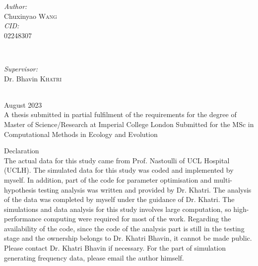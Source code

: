 \documentclass[12pt]{article}
\begin{document}
\begin{titlepage}

\begin{minipage}{0.4\textwidth}
\begin{flushleft} \large
\emph{Author:}\\
Chuxinyao \textsc{Wang} \\ %

\emph{CID:}\\
02248307
\end{flushleft}
\end{minipage}
~
\begin{minipage}{0.5\textwidth}
\begin{flushright} \large
\emph{Supervisor:} \\
Dr. Bhavin \textsc{Khatri} \\[0.5cm] %
\end{flushright}
\end{minipage}\\[1cm]


{\large August 2023}\\[0.5cm] %
A thesis submitted in partial fulfilment of the requirements for the degree of
Master of Science/Research at Imperial College London
Submitted for the MSc in Computational Methods in Ecology and Evolution

\vfill %
\newpage
Declaration\\
The actual data for this study came from Prof. Nastoulli of UCL Hospital (UCLH). The simulated data for this study was coded and implemented by myself. In addition, part of the code for parameter optimisation and multi-hypothesis testing analysis was written and provided by Dr. Khatri. The analysis of the data was completed by myself under the guidance of Dr. Khatri. The simulations and data analysis for this study involves large computation, so high-performance computing were required for most of the work. Regarding the availability of the code, since the code of the analysis part is still in the testing stage and the ownership belongs to Dr. Khatri Bhavin, it cannot be made public. Please contact Dr. Khatri Bhavin if necessary. For the part of simulation generating frequency data, please email the author himself.
\vfill
\end{titlepage}
\end{document}
